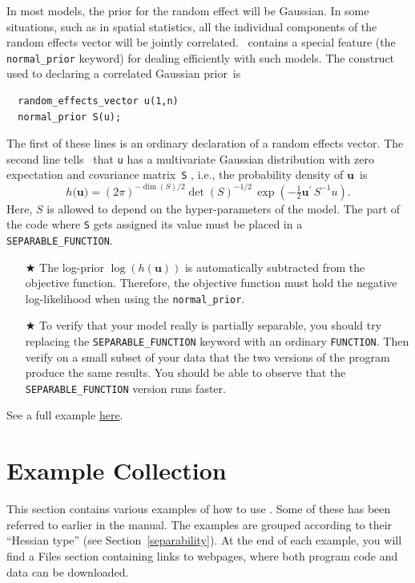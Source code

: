 \documentclass{admbmanual}
\begin{document}
In most models, the prior for the random effect will be Gaussian. In some
situations, such as in spatial statistics, all the individual components of the
random effects vector will be jointly correlated. \scAB\ contains a special
feature (the \texttt{normal\_prior} keyword) for dealing efficiently with such
models. The construct used to declaring a correlated Gaussian prior~is
\begin{lstlisting}
  random_effects_vector u(1,n)
  normal_prior S(u);
\end{lstlisting}
The first of these lines is an ordinary declaration of a random effects vector.
The second line tells \scAB\ that \texttt{u} has a multivariate Gaussian
distribution with zero expectation and covariance matrix~\texttt{S} , i.e., the
probability density of $\mathbf{u}$~is
\[
h(\mathbf{u)=}\left( 2\pi \right) ^{-\dim(S)/2}\det (S)^{-1/2}\,
\exp \left( - \tfrac{1}{2}\mathbf{u}^{\prime} \, S^{-1}u\right) .
\]
Here, $S$ is allowed to depend on the hyper-parameters of the model. The part of
the code where \texttt{S} gets assigned its value must be placed in a
\texttt{SEPARABLE\_FUNCTION}. %
\begin{itemize}
  \item[$\bigstar$] The log-prior $\log \left( h\left( \mathbf{u}\right) \right)
  $ is automatically subtracted from the objective function. Therefore, the
  objective function must hold the negative log-likelihood when using the
  \texttt{normal\_prior}.

  \item[$\bigstar$] To verify that your model really is partially separable, you
  should try replacing the \texttt{SEPARABLE\_FUNCTION} keyword with an ordinary
  \texttt{FUNCTION}. Then verify on a small subset of your data that the two
  versions of the program produce the same results. You should be able to
  observe that the \texttt{SEPARABLE\_FUNCTION} version runs faster.
\end{itemize}
See a full example
\href{http://otter-rsch.com/admbre/examples/spatial/spatial.html}{here}.

\appendix

\chapter{Example Collection}
\label{sec:example_collection}

This section contains various examples of how to use \scAR. Some of these has
been referred to earlier in the manual. The examples are grouped according to
their ``Hessian type'' (see Section~\ref{separability}). At the end of each
example, you will find a Files section containing links to webpages, where both
program code and data can be downloaded.
\end{document}
